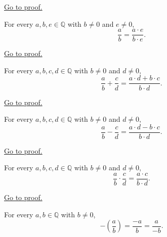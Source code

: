 \begin{remark*}[Proof]
\hyperref[prf:rational-cross-multiplication]{Go to proof.}
\end{remark*}

\begin{theorem}
\label{thm:rational-fraction-scaling}
For every $a,b,e\in\mathbb{Q}$ with $b\neq 0$ and $e\neq 0$,
\[
\frac{a}{b}=\frac{a\cdot e}{b\cdot e}.
\]
\end{theorem}

\begin{remark*}[Proof]
\hyperref[prf:rational-fraction-scaling]{Go to proof.}
\end{remark*}

\begin{theorem}
\label{thm:rational-fraction-addition}
For every $a,b,c,d\in\mathbb{Q}$ with $b\neq 0$ and $d\neq 0$,
\[
\frac{a}{b}+\frac{c}{d}
=
\frac{a\cdot d+b\cdot c}{b\cdot d}.
\]
\end{theorem}

\begin{remark*}[Proof]
\hyperref[prf:rational-fraction-addition]{Go to proof.}
\end{remark*}

\begin{theorem}
\label{thm:rational-fraction-subtraction}
For every $a,b,c,d\in\mathbb{Q}$ with $b\neq 0$ and $d\neq 0$,
\[
\frac{a}{b}-\frac{c}{d}
=
\frac{a\cdot d-b\cdot c}{b\cdot d}.
\]
\end{theorem}

\begin{remark*}[Proof]
\hyperref[prf:rational-fraction-subtraction]{Go to proof.}
\end{remark*}

\begin{theorem}
\label{thm:rational-fraction-multiplication}
For every $a,b,c,d\in\mathbb{Q}$ with $b\neq 0$ and $d\neq 0$,
\[
\frac{a}{b}\cdot \frac{c}{d}
=
\frac{a\cdot c}{b\cdot d}.
\]
\end{theorem}

\begin{remark*}[Proof]
\hyperref[prf:rational-fraction-multiplication]{Go to proof.}
\end{remark*}

\begin{theorem}
\label{thm:rational-fraction-negation}
For every $a,b\in\mathbb{Q}$ with $b\neq 0$,
\[
-\left(\frac{a}{b}\right)
=
\frac{-a}{b}
=
\frac{a}{-b}.
\]
\end{theorem}


